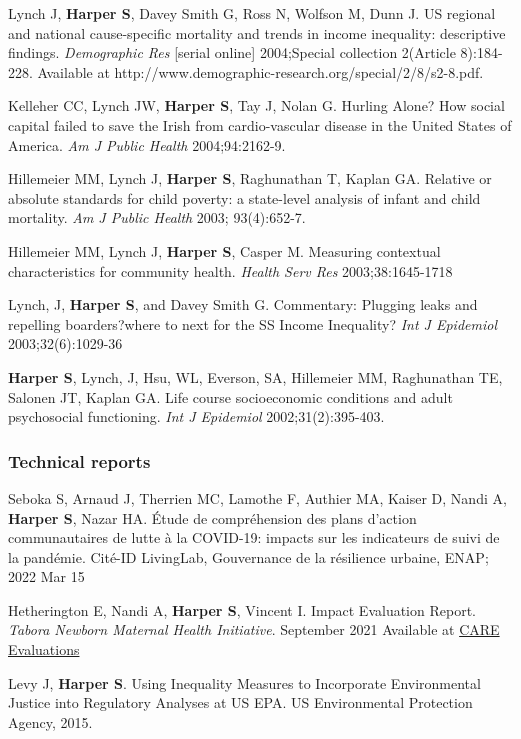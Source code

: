 \documentclass[
  letterpaper,
  DIV=11,
  numbers=noendperiod]{scrartcl}
\begin{document}
Lynch J, \textbf{Harper S}, Davey Smith G, Ross N, Wolfson M, Dunn J. US
regional and national cause-specific mortality and trends in income
inequality: descriptive findings. \emph{Demographic Res} {[}serial
online{]} 2004;Special collection 2(Article 8):184-228. Available at
http://www.demographic-research.org/special/2/8/s2-8.pdf.

Kelleher CC, Lynch JW, \textbf{Harper S}, Tay J, Nolan G. Hurling Alone?
How social capital failed to save the Irish from cardio-vascular disease
in the United States of America. \emph{Am J Public Health}
2004;94:2162-9.

Hillemeier MM, Lynch J, \textbf{Harper S}, Raghunathan T, Kaplan GA.
Relative or absolute standards for child poverty: a state-level analysis
of infant and child mortality. \emph{Am J Public Health} 2003;
93(4):652-7.

Hillemeier MM, Lynch J, \textbf{Harper S}, Casper M. Measuring
contextual characteristics for community health. \emph{Health Serv Res}
2003;38:1645-1718

Lynch, J, \textbf{Harper S}, and Davey Smith G. Commentary: Plugging
leaks and repelling boarders?where to next for the SS Income Inequality?
\emph{Int J Epidemiol} 2003;32(6):1029-36

\textbf{Harper S}, Lynch, J, Hsu, WL, Everson, SA, Hillemeier MM,
Raghunathan TE, Salonen JT, Kaplan GA. Life course socioeconomic
conditions and adult psychosocial functioning. \emph{Int J Epidemiol}
2002;31(2):395-403.

\subsubsection{Technical reports}\label{technical-reports}

Seboka S, Arnaud J, Therrien MC, Lamothe F, Authier MA, Kaiser D, Nandi
A, \textbf{Harper S}, Nazar HA. Étude de compréhension des plans
d'action communautaires de lutte à la COVID-19: impacts sur les
indicateurs de suivi de la pandémie. Cité-ID LivingLab, Gouvernance de
la résilience urbaine, ENAP; 2022 Mar 15

Hetherington E, Nandi A, \textbf{Harper S}, Vincent I. Impact Evaluation
Report. \emph{Tabora Newborn Maternal Health Initiative}. September 2021
Available at
\href{https://www.careevaluations.org/wp-content/uploads/TAMANI-impact-eval-report-FINAL.pdf}{CARE
Evaluations}

Levy J, \textbf{Harper S}. Using Inequality Measures to Incorporate
Environmental Justice into Regulatory Analyses at US EPA. US
Environmental Protection Agency, 2015.
\end{document}
